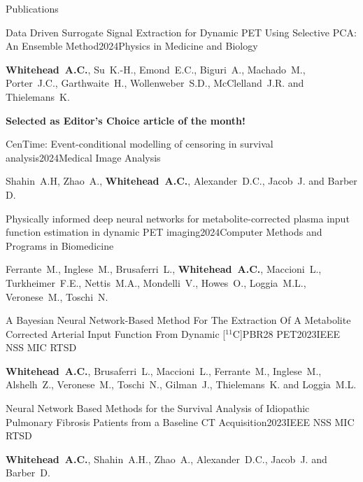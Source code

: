 \documentclass{cv}
\begin{document}
    \begin{rSection}{Publications}
        \begin{rSubsection}{Data Driven Surrogate Signal Extraction for Dynamic PET Using Selective PCA: An Ensemble Method}{2024}{Physics in Medicine and Biology}{}
            \item {\bf Whitehead~A.C.}, Su~K.-H., Emond~E.C., Biguri~A., Machado~M., Porter~J.C., Garthwaite~H., Wollenweber~S.D., McClelland~J.R. and Thielemans~K.

            {\bf Selected as Editor’s Choice article of the month!}
        \end{rSubsection}
        
        \begin{rSubsection}{CenTime: Event-conditional modelling of censoring in survival analysis}{2024}{Medical Image Analysis}{}
            \item Shahin~A.H, Zhao~A., {\bf Whitehead~A.C.}, Alexander~D.C., Jacob~J. and Barber D.
        \end{rSubsection}

        \begin{rSubsection}{Physically informed deep neural networks for metabolite-corrected plasma input function estimation in dynamic PET imaging}{2024}{Computer Methods and Programs in Biomedicine}{}
            \item Ferrante~M., Inglese~M., Brusaferri~L., {\bf Whitehead~A.C.}, Maccioni~L., Turkheimer~F.E., Nettis~M.A., Mondelli~V., Howes~O., Loggia~M.L., Veronese~M., Toschi~N.
        \end{rSubsection}

        \begin{rSubsection}{A Bayesian Neural Network-Based Method For The Extraction Of A Metabolite Corrected Arterial Input Function From Dynamic [$^{11}$C]PBR28 PET}{2023}{IEEE NSS MIC RTSD}{}
            \item {\bf Whitehead~A.C.}, Brusaferri~L., Maccioni~L., Ferrante~M., Inglese~M., Alshelh~Z., Veronese~M., Toschi~N., Gilman~J., Thielemans~K. and Loggia~M.L.
        \end{rSubsection}

        \begin{rSubsection}{Neural Network Based Methods for the Survival Analysis of Idiopathic Pulmonary Fibrosis Patients from a Baseline CT Acquisition}{2023}{IEEE NSS MIC RTSD}{}
            \item {\bf Whitehead~A.C.}, Shahin~A.H., Zhao~A., Alexander~D.C., Jacob~J. and Barber~D.
        \end{rSubsection}
        

\end{rSection}
\end{document}
